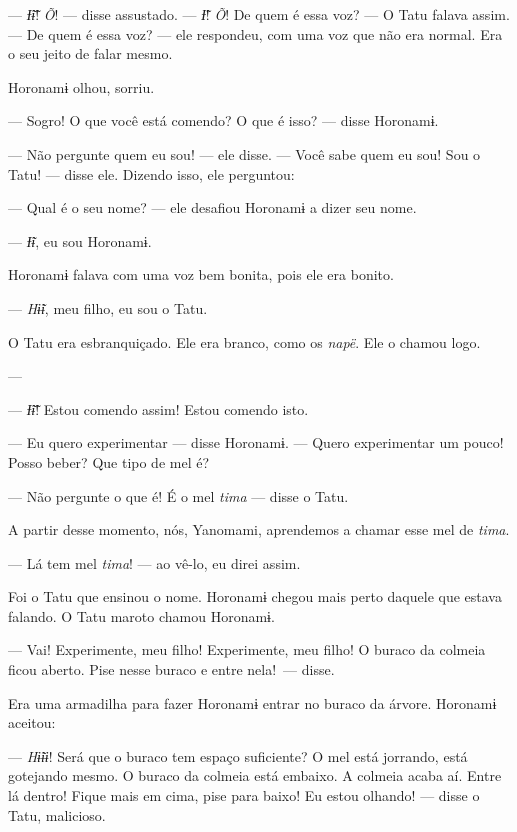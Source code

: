 --- \textit{Ɨ̃ɨ̃}! \textit{Õ}! --- disse assustado. --- \textit{Ɨ̃}! \textit{Õ}! De quem é 
essa voz? --- O Tatu falava assim. --- De quem é essa voz? --- ele respondeu, com uma voz que
não era normal. Era o seu jeito de falar mesmo. 

Horonamɨ olhou, sorriu.

--- Sogro! O que você está comendo? O que é isso? --- disse Horonamɨ. 

--- Não pergunte quem eu sou! --- ele disse. --- Você sabe quem eu sou!
Sou o Tatu! --- disse ele. Dizendo isso, ele perguntou: 

--- Qual é o seu nome? --- ele desafiou Horonamɨ a dizer seu nome. 

--- \textit{Ɨ̃ɨ}, eu sou Horonamɨ. 

Horonamɨ falava com uma voz bem bonita, pois ele era bonito. 

--- \textit{Hɨ̃ɨ}, meu filho, eu sou o Tatu. 

O Tatu era esbranquiçado. Ele era branco, como os \textit{napë}. Ele o
chamou logo. 

---  

--- \textit{Ɨ̃ɨ̃}! Estou comendo assim! Estou comendo isto.

--- Eu quero experimentar --- disse Horonamɨ. --- Quero experimentar um
pouco! Posso beber? Que tipo de mel é? 

--- Não pergunte o que é! É o mel \textit{tima} --- disse o Tatu. 

A partir desse momento, nós, Yanomami, aprendemos a chamar esse mel
de \textit{tima}. 

--- Lá tem mel \textit{tima}! --- ao vê-lo, eu direi assim. 

Foi o Tatu que ensinou o nome. Horonamɨ chegou mais perto daquele que
 estava falando. O Tatu maroto chamou Horonamɨ. 

--- Vai! Experimente, meu filho! Experimente, meu filho! O buraco da
 colmeia ficou aberto. Pise nesse buraco e entre nela!~--- disse.

Era uma armadilha para fazer Horonamɨ entrar no buraco da árvore. Horonamɨ
aceitou: 

--- \textit{Hɨ̃ɨɨ}! Será que o buraco tem espaço suficiente? O mel está jorrando,
está gotejando mesmo. O buraco da colmeia está embaixo. A colmeia acaba
aí. Entre lá dentro! Fique mais em cima, pise para baixo! Eu estou
olhando! --- disse o Tatu, malicioso. 

